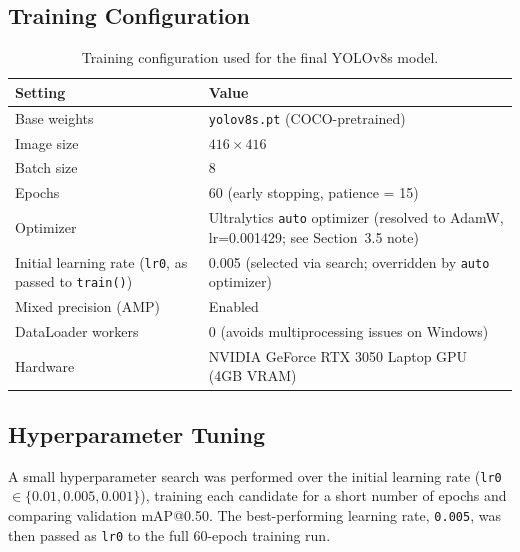 \documentclass[12pt]{article}
\begin{document}
\subsection{Training Configuration}
\begin{table}[H]
\centering
\caption{Training configuration used for the final YOLOv8s model.}
\label{tab:train-config}
\begin{tabular}{@{}L{4.3cm}L{8.7cm}@{}}
\toprule
\textbf{Setting} & \textbf{Value} \\
\midrule
Base weights & \texttt{yolov8s.pt} (COCO-pretrained) \\
Image size & $416 \times 416$ \\
Batch size & 8 \\
Epochs & 60 (early stopping, patience = 15) \\
Optimizer & Ultralytics \texttt{auto} optimizer (resolved to AdamW, lr=0.001429; see Section~3.5 note) \\
Initial learning rate (\texttt{lr0}, as passed to \texttt{train()}) & 0.005 (selected via search; overridden by \texttt{auto} optimizer) \\
Mixed precision (AMP) & Enabled \\
DataLoader workers & 0 (avoids multiprocessing issues on Windows) \\
Hardware & NVIDIA GeForce RTX 3050 Laptop GPU (4GB VRAM) \\
\bottomrule
\end{tabular}
\end{table}

\subsection{Hyperparameter Tuning}
A small hyperparameter search was performed over the initial learning rate
(\texttt{lr0} $\in \{0.01, 0.005, 0.001\}$), training each candidate for a
short number of epochs and comparing validation mAP@0.50. The best-performing
learning rate, \texttt{0.005}, was then passed as \texttt{lr0} to the full
60-epoch training run.
\end{document}

